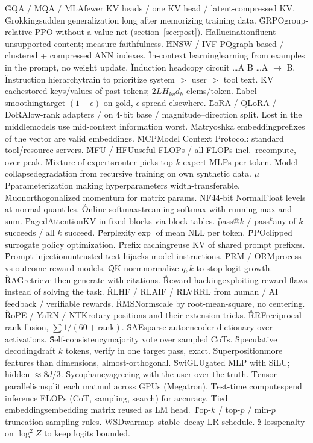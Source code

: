 {\G{GQA / MQA / MLA}{fewer KV heads / one KV head / latent-compressed KV.}
\G{Grokking}{sudden generalization long after memorizing training data.}
\G{GRPO}{group-relative PPO without a value net (section~\ref{sec:post}).}
\G{Hallucination}{fluent unsupported content; measure faithfulness.}
\G{HNSW / IVF-PQ}{graph-based / clustered + compressed ANN indexes.}
\G{In-context learning}{learning from examples in the prompt, no weight update.}
\G{Induction head}{copy circuit \dots A B \dots A $\to$ B.}
\G{Instruction hierarchy}{train to prioritize system $>$ user $>$ tool text.}
\G{KV cache}{stored keys/values of past tokens; $2LH_{kv}d_h$ elems/token.}
\G{Label smoothing}{target $(1-\epsilon)$ on gold, $\epsilon$ spread elsewhere.}
\G{LoRA / QLoRA / DoRA}{low-rank adapters / on 4-bit base / magnitude--direction split.}
\G{Lost in the middle}{models use mid-context information worst.}
\G{Matryoshka embedding}{prefixes of the vector are valid embeddings.}
\G{MCP}{Model Context Protocol: standard tool/resource servers.}
\G{MFU / HFU}{useful FLOPs / all FLOPs incl.\ recompute, over peak.}
\G{Mixture of experts}{router picks top-$k$ expert MLPs per token.}
\G{Model collapse}{degradation from recursive training on own synthetic data.}
\G{$\mu$P}{parameterization making hyperparameters width-transferable.}
\G{Muon}{orthogonalized momentum for matrix params.}
\G{NF4}{4-bit NormalFloat levels at normal quantiles.}
\G{Online softmax}{streaming softmax with running max and sum.}
\G{PagedAttention}{KV in fixed blocks via block tables.}
\G{pass@$k$ / pass$^k$}{any of $k$ succeeds / all $k$ succeed.}
\G{Perplexity}{$\exp$ of mean NLL per token.}
\G{PPO}{clipped surrogate policy optimization.}
\G{Prefix caching}{reuse KV of shared prompt prefixes.}
\G{Prompt injection}{untrusted text hijacks model instructions.}
\G{PRM / ORM}{process vs outcome reward models.}
\G{QK-norm}{normalize $q,k$ to stop logit growth.}
\G{RAG}{retrieve then generate with citations.}
\G{Reward hacking}{exploiting reward flaws instead of solving the task.}
\G{RLHF / RLAIF / RLVR}{RL from human / AI feedback / verifiable rewards.}
\G{RMSNorm}{scale by root-mean-square, no centering.}
\G{RoPE / YaRN / NTK}{rotary positions and their extension tricks.}
\G{RRF}{reciprocal rank fusion, $\sum1/(60+\text{rank})$.}
\G{SAE}{sparse autoencoder dictionary over activations.}
\G{Self-consistency}{majority vote over sampled CoTs.}
\G{Speculative decoding}{draft $k$ tokens, verify in one target pass, exact.}
\G{Superposition}{more features than dimensions, almost-orthogonal.}
\G{SwiGLU}{gated MLP with SiLU; hidden $\approx8d/3$.}
\G{Sycophancy}{agreeing with the user over the truth.}
\G{Tensor parallelism}{split each matmul across GPUs (Megatron).}
\G{Test-time compute}{spend inference FLOPs (CoT, sampling, search) for accuracy.}
\G{Tied embeddings}{embedding matrix reused as LM head.}
\G{Top-$k$ / top-$p$ / min-$p$}{truncation sampling rules.}
\G{WSD}{warmup--stable--decay LR schedule.}
\G{z-loss}{penalty on $\log^2 Z$ to keep logits bounded.}
}
